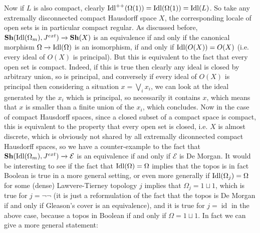 \documentclass{article}
\newcommand{\id}{\operatorname{id}}
\begin{document}
Now if $L$ is also compact, clearly $\textup{Idl}^{++}(\Omega(1))=\textup{Idl}(\Omega(1))=\textup{Idl}(L)$. So take any extremally disconnected compact Hausdorff space $X$, the corresponding locale of open sets is in particular compact regular. As discussed before, $\mathbf{Sh}(\textup{Idl}(\Omega_m),J^{ext})\xrightarrow{}\mathbf{Sh}(X)$ is an equivalence if and only if the canonical morphism $\Omega\xrightarrow{}\textup{Idl}(\Omega)$ is an isomorphism, if and only if $\textup{Idl}(O(X))=O(X)$ (i.e. every ideal of $O(X)$ is principal). But this is equivalent to the fact that every open set is compact. Indeed, if this is true then clearly any ideal is closed by arbitrary union, so is principal, and conversely if every ideal of $O(X)$ is principal then considering a situation $x=\bigvee_i x_i$, we can look at the ideal generated by the $x_i$ which is principal, so necessarily it contains $x$, which means that $x$ is smaller than a finite union of the $x_i$, which concludes. Now in the case of compact Hausdorff spaces, since a closed subset of a compact space is compact, this is equivalent to  the property that every open set is closed, i.e. $X$ is almost discrete, which is obviously not shared by all extremally diconnected compact Hausdorff spaces, so we have a counter-example to the fact that $\mathbf{Sh}(\textup{Idl}(\Omega_m),J^{ext})\xrightarrow{}\mathcal{E}$ is an equivalence if and only if $\mathcal{E}$ is De Morgan. It would be interesting to see if the fact that $\textup{Idl}(\Omega)=\Omega$ implies that the topos is in fact Boolean is true in a more general setting, or even more generally if $\textup{Idl}(\Omega_j)=\Omega$ for some (dense) Lawvere-Tierney topology $j$ implies that $\Omega_j=1\sqcup 1$, which is true for $j=\neg\neg$ (it is just a reformulation of the fact that the topos is De Morgan if and only if Gleason's cover is an equivalence), and it is true for $j=\id$ in the above case, because a topos in Boolean if and only if $\Omega=1\sqcup 1$. In fact we can give a more general statement:
\end{document}
